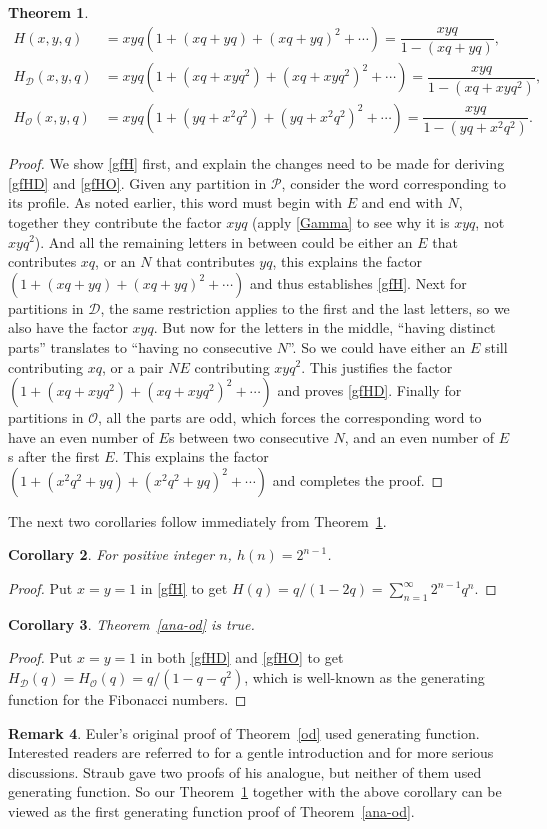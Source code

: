 \documentclass[12pt]{amsart}
\numberwithin{equation}{section}
\theoremstyle{plain}
\newtheorem{theorem}{Theorem}[section]
\newtheorem{corollary}[theorem]{Corollary}
\theoremstyle{definition}
\newtheorem{remark}[theorem]{Remark}
\def\D{\mathcal{D}}
\def\O{\mathcal{O}}
\def\P{\mathcal{P}}
\begin{document}
\begin{theorem}\label{gfxyq}
\begin{align}
H(x,y,q) &= xyq(1+(xq+yq)+(xq+yq)^2+\cdots)=\dfrac{xyq}{1-(xq+yq)},\label{gfH}\\
H_{\D}(x,y,q) &= xyq(1+(xq+xyq^2)+(xq+xyq^2)^2+\cdots)=\dfrac{xyq}{1-(xq+xyq^2)},\label{gfHD}\\
H_{\O}(x,y,q) &= xyq(1+(yq+x^2q^2)+(yq+x^2q^2)^2+\cdots)=\dfrac{xyq}{1-(yq+x^2q^2)}\label{gfHO}.
\end{align}
\end{theorem}
\begin{proof}
We show \eqref{gfH} first, and explain the changes need to be made for deriving \eqref{gfHD} and \eqref{gfHO}. Given any partition in $\P$, consider the word corresponding to its profile. As noted earlier, this word must begin with $E$ and end with $N$, together they contribute the factor $xyq$ (apply \eqref{Gamma} to see why it is $xyq$, not $xyq^2$). And all the remaining letters in between could be either an $E$ that contributes $xq$, or an $N$ that contributes $yq$, this explains the factor $(1+(xq+yq)+(xq+yq)^2+\cdots)$ and thus establishes \eqref{gfH}. Next for partitions in $\D$, the same restriction applies to the first and the last letters, so we also have the factor $xyq$. But now for the letters in the middle, ``having distinct parts'' translates to ``having no consecutive $N$''. So we could have either an $E$ still contributing $xq$, or a pair $NE$ contributing $xyq^2$. This justifies the factor $(1+(xq+xyq^2)+(xq+xyq^2)^2+\cdots)$ and proves \eqref{gfHD}. Finally for partitions in $\O$, all the parts are odd, which forces the corresponding word to have an even number of $E$s between two consecutive $N$, and an even number of $E$s after the first $E$. This explains the factor $(1+(x^2q^2+yq)+(x^2q^2+yq)^2+\cdots)$ and completes the proof.
\end{proof}
The next two corollaries follow immediately from Theorem~\ref{gfxyq}.
\begin{corollary}\label{h(n)}
For positive integer $n$, $h(n)=2^{n-1}$.
\end{corollary}
\begin{proof}
Put $x=y=1$ in \eqref{gfH} to get $H(q)=q/(1-2q)=\sum_{n=1}^{\infty}2^{n-1}q^n$.
\end{proof}
\begin{corollary}
Theorem~\ref{ana-od} is true.
\end{corollary}
\begin{proof}
Put $x=y=1$ in both \eqref{gfHD} and \eqref{gfHO} to get $H_{\D}(q)=H_{\O}(q)=q/(1-q-q^2)$, which is well-known as the generating function for the Fibonacci numbers.
\end{proof}
\begin{remark}
Euler's original proof of Theorem~\ref{od} used generating function. Interested readers are referred to \cite[Chapter~2,5]{AE} for a gentle introduction and \cite{Andr} for more serious discussions. Straub \cite{Str} gave two proofs of his analogue, but neither of them used generating function. So our Theorem~\ref{gfxyq} together with the above corollary can be viewed as the first generating function proof of Theorem~\ref{ana-od}.
\end{remark}
\end{document}
